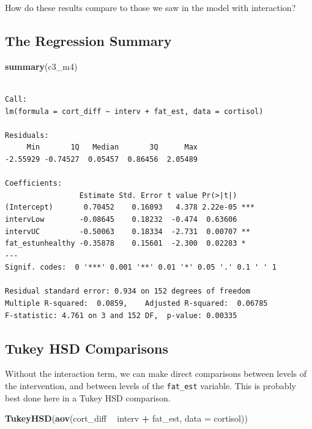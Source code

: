 \documentclass[]{book}
\newenvironment{Shaded}{\begin{snugshade}}{\end{snugshade}}
\newcommand{\KeywordTok}[1]{\textcolor[rgb]{0.13,0.29,0.53}{\textbf{#1}}}
\newcommand{\DataTypeTok}[1]{\textcolor[rgb]{0.13,0.29,0.53}{#1}}
\newcommand{\StringTok}[1]{\textcolor[rgb]{0.31,0.60,0.02}{#1}}
\newcommand{\OperatorTok}[1]{\textcolor[rgb]{0.81,0.36,0.00}{\textbf{#1}}}
\newcommand{\NormalTok}[1]{#1}
\theoremstyle{definition}
\theoremstyle{definition}
\theoremstyle{definition}
\theoremstyle{remark}
\begin{document}
How do these results compare to those we saw in the model with
interaction?

\subsection{The Regression Summary}\label{the-regression-summary}

\begin{Shaded}
\begin{Highlighting}[]
\KeywordTok{summary}\NormalTok{(c3_m4)}
\end{Highlighting}
\end{Shaded}

\begin{verbatim}

Call:
lm(formula = cort_diff ~ interv + fat_est, data = cortisol)

Residuals:
     Min       1Q   Median       3Q      Max 
-2.55929 -0.74527  0.05457  0.86456  2.05489 

Coefficients:
                 Estimate Std. Error t value Pr(>|t|)    
(Intercept)       0.70452    0.16093   4.378 2.22e-05 ***
intervLow        -0.08645    0.18232  -0.474  0.63606    
intervUC         -0.50063    0.18334  -2.731  0.00707 ** 
fat_estunhealthy -0.35878    0.15601  -2.300  0.02283 *  
---
Signif. codes:  0 '***' 0.001 '**' 0.01 '*' 0.05 '.' 0.1 ' ' 1

Residual standard error: 0.934 on 152 degrees of freedom
Multiple R-squared:  0.0859,    Adjusted R-squared:  0.06785 
F-statistic: 4.761 on 3 and 152 DF,  p-value: 0.00335
\end{verbatim}

\subsection{Tukey HSD Comparisons}\label{tukey-hsd-comparisons}

Without the interaction term, we can make direct comparisons between
levels of the intervention, and between levels of the \texttt{fat\_est}
variable. This is probably best done here in a Tukey HSD comparison.

\begin{Shaded}
\begin{Highlighting}[]
\KeywordTok{TukeyHSD}\NormalTok{(}\KeywordTok{aov}\NormalTok{(cort_diff }\OperatorTok{~}\StringTok{ }\NormalTok{interv }\OperatorTok{+}\StringTok{ }\NormalTok{fat_est, }\DataTypeTok{data =}\NormalTok{ cortisol))}
\end{Highlighting}
\end{Shaded}
\end{document}

